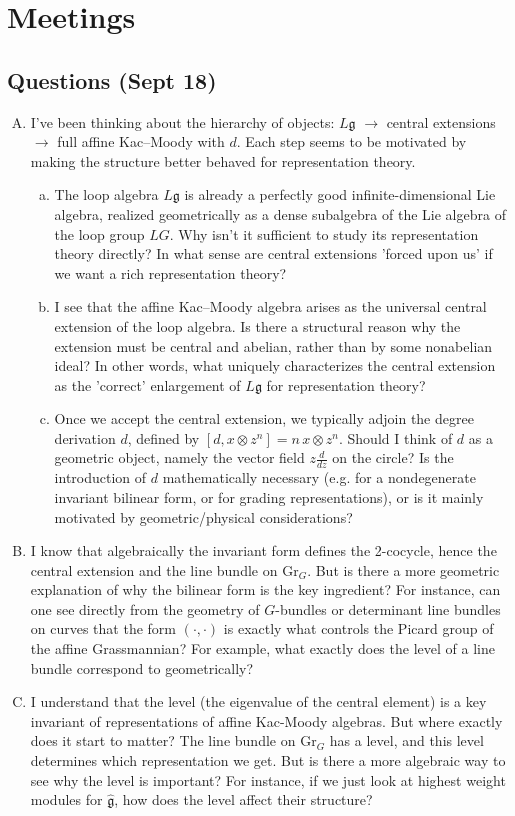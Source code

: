 \documentclass[12pt]{article}
\begin{document}
\section*{Meetings}
\subsection*{Questions (Sept 18)}
\begin{enumerate}[A.]
    \item I've been thinking about the hierarchy of objects: $L\mathfrak g$ $\to$ central extensions $\to$ full affine Kac–Moody with $d$. Each step seems to be motivated by making the structure better behaved for representation theory.
          \begin{enumerate}[(a)]
              \item The loop algebra $L\mathfrak g$ is already a perfectly good infinite-dimensional Lie algebra, realized geometrically as a dense subalgebra of the Lie algebra of the loop group $LG$. Why isn't it sufficient to study its representation theory directly? In what sense are central extensions 'forced upon us' if we want a rich representation theory?
              \item I see that the affine Kac–Moody algebra arises as the universal central extension of the loop algebra. Is there a structural reason why the extension must be central and abelian, rather than by some nonabelian ideal? In other words, what uniquely characterizes the central extension as the 'correct' enlargement of $L\mathfrak g$ for representation theory?
              \item Once we accept the central extension, we typically adjoin the degree derivation $d$, defined by $[d, x\otimes z^n]=n\,x\otimes z^n$. Should I think of $d$ as a geometric object, namely the vector field $z\frac{d}{dz}$ on the circle? Is the introduction of $d$ mathematically necessary (e.g. for a nondegenerate invariant bilinear form, or for grading representations), or is it mainly motivated by geometric/physical considerations?
          \end{enumerate}
    \item I know that algebraically the invariant form defines the 2-cocycle, hence the central extension and the line bundle on $\mathrm{Gr}_G$. But is there a more geometric explanation of why the bilinear form is the key ingredient? For instance, can one see directly from the geometry of $G$-bundles or determinant line bundles on curves that the form $(\cdot,\cdot)$ is exactly what controls the Picard group of the affine Grassmannian? For example, what exactly does the level of a line bundle correspond to geometrically?
    \item I understand that the level (the eigenvalue of the central element) is a key invariant of representations of affine Kac-Moody algebras. But where exactly does it start to matter? The line bundle on $\mathrm{Gr}_G$ has a level, and this level determines which representation we get. But is there a more algebraic way to see why the level is important? For instance, if we just look at highest weight modules for $\widehat{\mathfrak g}$, how does the level affect their structure?
\end{enumerate}
\end{document}
